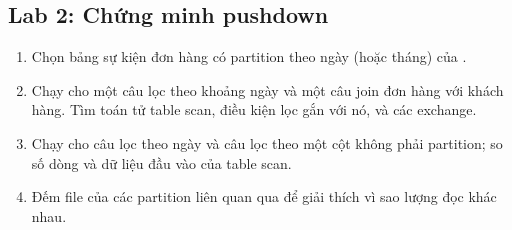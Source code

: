\subsection{Lab 2: Chứng minh pushdown}
\begin{enumerate}
  \item Chọn bảng sự kiện đơn hàng có partition theo ngày (hoặc tháng) của .
  \item Chạy  cho một câu lọc theo khoảng ngày và một câu join đơn hàng với khách hàng. Tìm toán tử table scan, điều kiện lọc gắn với nó, và các exchange.
  \item Chạy  cho câu lọc theo ngày và câu lọc theo một cột không phải partition; so số dòng và dữ liệu đầu vào của table scan.
  \item Đếm file của các partition liên quan qua  để giải thích vì sao lượng đọc khác nhau.
\end{enumerate}


